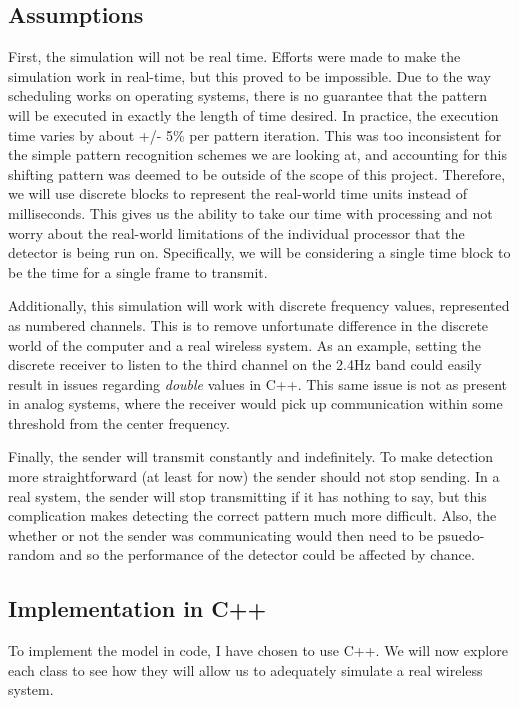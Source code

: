 \documentclass[conference]{IEEEtran}
\begin{document}
\subsection{Assumptions}

First, the simulation will not be real time.
Efforts were made to make the simulation work in real-time, but this proved to be impossible.
Due to the way scheduling works on operating systems, there is no guarantee that the pattern will be executed in exactly the length of time desired.
In practice, the execution time varies by about +/- 5\% per pattern iteration.
This was too inconsistent for the simple pattern recognition schemes we are looking at, and accounting for this shifting pattern was deemed to be outside of the scope of this project.
Therefore, we will use discrete blocks to represent the real-world time units instead of milliseconds.
This gives us the ability to take our time with processing and not worry about the real-world limitations of the individual processor that the detector is being run on.
Specifically, we will be considering a single time block to be the time for a single frame to transmit.

Additionally, this simulation will work with discrete frequency values, represented as numbered channels.
This is to remove unfortunate difference in the discrete world of the computer and a real wireless system.
As an example, setting the discrete receiver to listen to the third channel on the 2.4Hz band could easily result in issues regarding \textit{double} values in C++.
This same issue is not as present in analog systems, where the receiver would pick up communication within some threshold from the center frequency.

Finally, the sender will transmit constantly and indefinitely.
To make detection more straightforward (at least for now) the sender should not stop sending.
In a real system, the sender will stop transmitting if it has nothing to say, but this complication makes detecting the correct pattern much more difficult.
Also, the whether or not the sender was communicating would then need to be psuedo-random and so the performance of the detector could be affected by chance.

\subsection{Implementation in C++}

To implement the model in code, I have chosen to use C++.
We will now explore each class to see how they will allow us to adequately simulate a real wireless system. 
\end{document}
